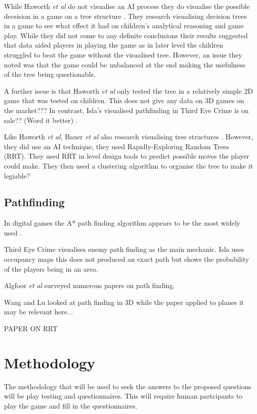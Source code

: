 \documentclass[journal]{IEEEtran}
\begin{document}
While Haworth \textit{et al} do not visualise an AI process they do visualise the possible decsision in a game on a tree structure \cite{Haworth2010}. They research visualising decision trees in a game to see what effect it had on children's analytical reasoning and game play.  While they did not come to any definite conclusions their results suggested that data aided players in playing the game as in later level the children struggled to beat the game without the visualised tree. However, an issue they noted was that the game could be unbalanced at the end making the usefulness of the tree being questionable.  

A further issue is that Haworth \textit{et al} only tested the tree in a relatively simple 2D game that was tested on children. This does not give any data on 3D games on the market??? In contrast, Isla's visualised pathfinding in Third Eye Crime is on sale?? (Word it better) \cite{Isla2014}.
 
Like  Haworth \textit{et al}, Bauer \textit{et al} also research visualising tree structures \cite{bauer2012}. However, they did use an AI technique, they used Rapidly-Exploring Random Trees (RRT). They used RRT in level design tools to predict possible moves the player could make.  They then used a clustering algorithm to organise the tree to make it legiable? 

 


\subsection{Pathfinding}
In digital games the A* path finding algorithm appears to be the most widely used \cite{Algfoor2015}. 

Third Eye Crime \cite{Isla2014} visualises enemy path finding as the main mechanic. Isla uses occupancy maps this does not produced an exact path but shows the probability of the players being in an area. 

Algfoor \textit{et al} surveyed numerous papers on path finding. 

Wang and Lu looked at path finding in 3D while the paper applied to planes it may be relevant here... \cite{wang2012}

PAPER ON RRT



\section{Methodology}
The methodology that will be used to seek the answers to the proposed questions will be play testing and questionnaires. This will require human partcipants to play the game and fill in the questionnaires. 
\end{document}
